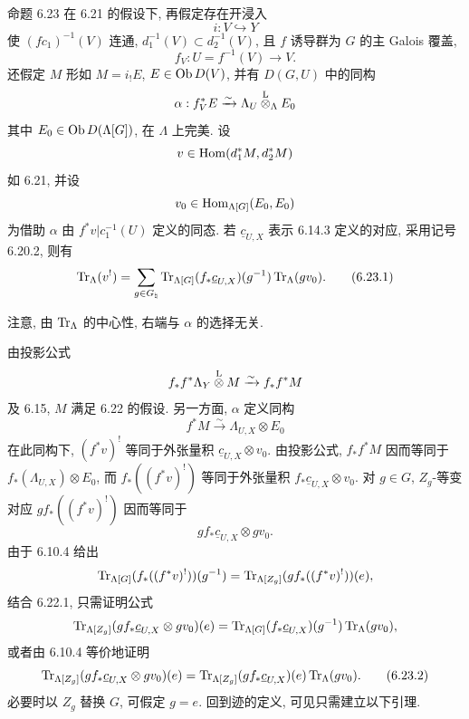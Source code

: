 \begin{statement}{命题 6.23}
在 6.21 的假设下, 再假定存在开浸入
\[
i:V\hookrightarrow Y
\]
使 $(fc_1)^{-1}(V)$ 连通, $d_1^{-1}(V)\subset d_2^{-1}(V)$, 且 $f$ 诱导群为 $G$ 的主 Galois 覆盖,
\[
f_V:U=f^{-1}(V)\to V.
\]
还假定 $M$ 形如 $M=i_!E$, $E\in\operatorname{Ob} D(V)$, 并有 $D(G,U)$ 中的同构
\[
\alpha:f_V^*E\xrightarrow{\sim}\Lambda_U\overset{\mathrm L}{\otimes}_{\Lambda}E_0
\]
其中 $E_0\in\operatorname{Ob} D(\Lambda[G])$, 在 $\Lambda$ 上完美. 设
\[
v\in\operatorname{Hom}(d_1^*M,d_2^*M)
\]
如 6.21, 并设
\[
v_0\in\operatorname{Hom}_{\Lambda[G]}(E_0,E_0)
\]
为借助 $\alpha$ 由 $f^*v|c_1^{-1}(U)$ 定义的同态. 若 $\underline c_{U,X}$ 表示 6.14.3 定义的对应, 采用记号 6.20.2, 则有
\begin{equation}
\operatorname{Tr}_{\Lambda}(v^!)
=
\sum_{g\in G_{\natural}}
\operatorname{Tr}_{\Lambda[G]}(f_*\underline c_{U,X})(g^{-1})\operatorname{Tr}_{\Lambda}(gv_0).
\tag{6.23.1}
\end{equation}
\end{statement}

注意, 由 $\operatorname{Tr}_{\Lambda}$ 的中心性, 右端与 $\alpha$ 的选择无关.

由投影公式
\[
f_*f^*\Lambda_Y\overset{\mathrm L}{\otimes} M\xrightarrow{\sim}f_*f^*M
\]
及 6.15, $M$ 满足 6.22 的假设. 另一方面, $\alpha$ 定义同构
\[
f^*M\xrightarrow{\sim}\Lambda_{U,X}\otimes E_0
\]
在此同构下, $(f^*v)^!$ 等同于外张量积 $\underline c_{U,X}\otimes v_0$. 由投影公式, $f_*f^*M$ 因而等同于 $f_*(\Lambda_{U,X})\otimes E_0$, 而 $f_*((f^*v)^!)$ 等同于外张量积 $f_*\underline c_{U,X}\otimes v_0$. 对 $g\in G$, $Z_g$-等变对应 $gf_*((f^*v)^!)$ 因而等同于
\[
gf_*\underline c_{U,X}\otimes gv_0.
\]
由于 6.10.4 给出
\[
\operatorname{Tr}_{\Lambda[G]}(f_*((f^*v)^!))(g^{-1})
=
\operatorname{Tr}_{\Lambda[Z_g]}(gf_*((f^*v)^!))(e),
\]
结合 6.22.1, 只需证明公式
\[
\operatorname{Tr}_{\Lambda[Z_g]}(gf_*\underline c_{U,X}\otimes gv_0)(e)
=
\operatorname{Tr}_{\Lambda[G]}(f_*\underline c_{U,X})(g^{-1})\operatorname{Tr}_{\Lambda}(gv_0),
\]
或者由 6.10.4 等价地证明
\begin{equation}
\operatorname{Tr}_{\Lambda[Z_g]}(gf_*\underline c_{U,X}\otimes gv_0)(e)
=
\operatorname{Tr}_{\Lambda[Z_g]}(gf_*\underline c_{U,X})(e)\operatorname{Tr}_{\Lambda}(gv_0).
\tag{6.23.2}
\end{equation}
必要时以 $Z_g$ 替换 $G$, 可假定 $g=e$. 回到迹的定义, 可见只需建立以下引理.

